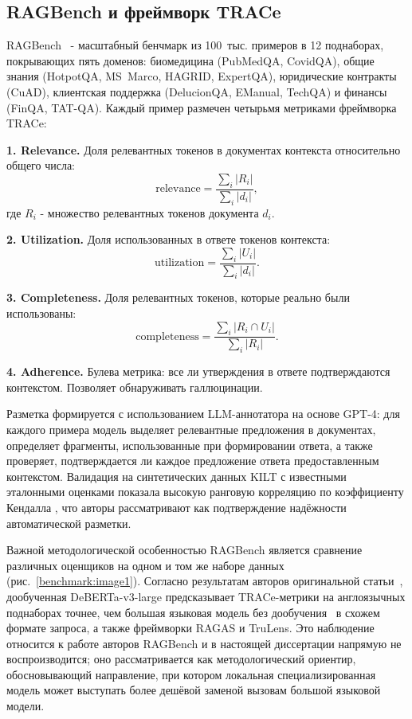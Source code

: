 \subsection{RAGBench и фреймворк TRACe}
\label{sec:ragbench}

RAGBench~\cite{friel2024ragbench} - масштабный бенчмарк из 100~тыс. 
примеров в 12 поднаборах, покрывающих пять доменов: биомедицина (PubMedQA, CovidQA),
 общие знания (HotpotQA, MS~Marco, HAGRID, ExpertQA), юридические контракты (CuAD),
  клиентская поддержка (DelucionQA, EManual, TechQA) и финансы (FinQA, TAT-QA). 
  Каждый пример размечен четырьмя метриками фреймворка TRACe:

\textbf{1. Relevance.} Доля релевантных токенов в документах контекста относительно общего числа:
\[
\text{relevance} = \frac{\sum_{i} |R_i|}{\sum_{i} |d_i|},
\]
где $R_i$ - множество релевантных токенов документа $d_i$.

\textbf{2. Utilization.} Доля использованных в ответе токенов контекста:
\[
\text{utilization} = \frac{\sum_{i} |U_i|}{\sum_{i} |d_i|}.
\]

\textbf{3. Completeness.} Доля релевантных токенов, которые реально были использованы:
\[
\text{completeness} = \frac{\sum_{i} |R_i \cap U_i|}{\sum_{i} |R_i|}.
\]

\textbf{4. Adherence.} Булева метрика: все ли утверждения в ответе подтверждаются контекстом.
 Позволяет обнаруживать галлюцинации.

Разметка формируется с использованием LLM-аннотатора на основе GPT-4: для каждого 
примера модель выделяет релевантные предложения в документах, определяет фрагменты, 
использованные при формировании ответа, а также проверяет, подтверждается ли каждое 
предложение ответа предоставленным контекстом. Валидация на синтетических данных KILT с
 известными эталонными оценками показала высокую ранговую корреляцию по коэффициенту 
 Кендалла \cite{kendall1938new}, что авторы рассматривают как подтверждение надёжности 
 автоматической разметки.

Важной методологической особенностью RAGBench является
 сравнение различных оценщиков на одном и том же наборе данных
 (рис.~\ref{benchmark:image1}). Согласно результатам авторов оригинальной
 статьи~\cite{friel2024ragbench}, дообученная DeBERTa-v3-large \cite{he2021debertav3} предсказывает
 TRACe-метрики на англоязычных поднаборах точнее, чем большая языковая
 модель без дообучения~\cite{brown2020language} в схожем формате запроса,
 а также фреймворки RAGAS и TruLens. Это наблюдение относится к работе авторов
 RAGBench и в настоящей диссертации напрямую не воспроизводится; оно
 рассматривается как методологический ориентир, обосновывающий направление,
 при котором локальная специализированная модель может выступать более дешёвой
 заменой вызовам большой языковой модели.

